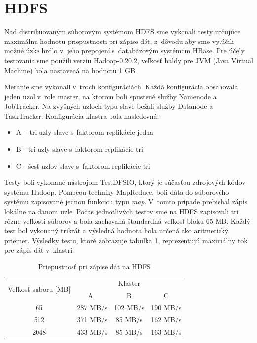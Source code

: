 \documentclass[11pt,twoside,a4paper]{book}
\begin{document}
\section{HDFS}
Nad distribuovaným súborovým systémom HDFS sme vykonali testy určujúce maximálnu hodnotu priepustnosti pri zápise dát, z~dôvodu aby sme vylúčili možné úzke hrdlo v~jeho prepojení s~databázovým systémom HBase. Pre účely testovania sme použili verziu Hadoop-0.20.2, veľkosť haldy pre JVM (Java Virtual Machine) bola nastavená na hodnotu 1 GB.

Meranie sme vykonali v~troch konfiguráciách. Každá konfigurácia obsahovala jeden uzol v~role master, na ktorom boli spustené služby Namenode a JobTracker. Na zvyšných uzloch typu slave bežali služby Datanode a TaskTracker. Konfigurácia klastra bola nasledovná:

\begin{itemize}
 \item A~- tri uzly slave s~faktorom replikácie jedna
 \item B - tri uzly slave s~faktorom replikácie tri
 \item C - šesť uzlov slave s~faktorom replikácie tri
\end{itemize}

Testy boli vykonané nástrojom TestDFSIO, ktorý je súčasťou zdrojových kódov systému Hadoop. Pomocou techniky MapReduce, boli dáta do súborového systému zapisované jednou funkciou typu \emph{map}. V~tomto prípade prebiehal zápis lokálne na danom uzle. Počas jednotlivých testov sme na HDFS zapisovali tri rôzne veľkosti súborov a bola zachovaná štandardná veľkosť bloku 65 MB. Každý test bol vykonaný trikrát a výsledná hodnota bola určená ako aritmetický priemer. Výsledky testu, ktoré zobrazuje tabuľka \ref{tab:HDFSperformance}, reprezentujú maximálny tok pre zápis dát v~klastri.

\begin{table}[hp]
\begin{center}
\begin{tabular}{|c|c|c|c|}
\hline 
\multirow{2}{*}{Veľkosť súboru [MB]} & \multicolumn{3}{|c|}{Klaster}  \\

& A~& B & C\\
\hline 65 & 287 MB/s& 102 MB/s& 190 MB/s\\ 
\hline 512 & 371 MB/s& 85 MB/s& 162 MB/s\\ 
\hline 2048 & 433 MB/s& 85 MB/s& 163 MB/s\\ 
\hline
\end{tabular} 
\end{center}
\caption{Priepustnosť pri zápise dát na HDFS}
\label{tab:HDFSperformance}
\end{table}
\end{document}
